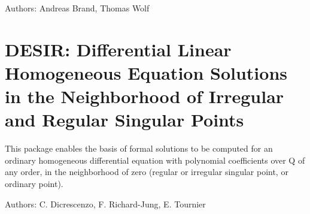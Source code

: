 Authors: Andreas Brand, Thomas Wolf

\newpage

\section{DESIR: Differential Linear Homogeneous Equation Solutions in the
              Neighborhood of Irregular and Regular Singular Points}

This package enables the basis of formal solutions to be computed for an
ordinary homogeneous differential equation with polynomial coefficients
over Q of any order, in the neighborhood of zero (regular or irregular
singular point, or ordinary point).

Authors: C. Dicrescenzo, F. Richard-Jung, E. Tournier



\newpage

